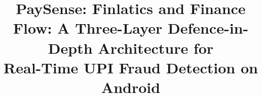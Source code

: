 \documentclass[conference]{IEEEtran}
\begin{document}
\graphicspath{{./}{./plots/}}

\title{PaySense: Finlatics and Finance Flow: A Three-Layer Defence-in-Depth Architecture for\\
Real-Time UPI Fraud Detection on Android}

\author{
}

\maketitle

\end{document}
